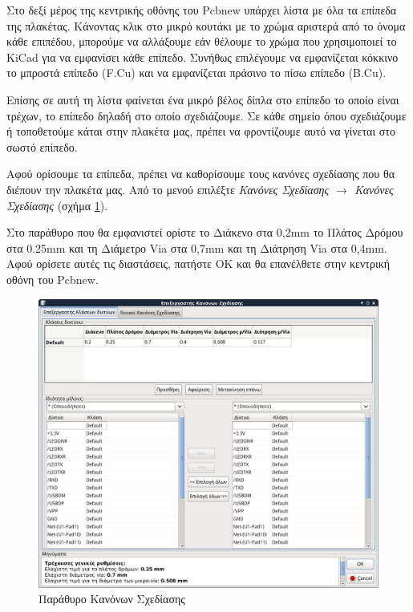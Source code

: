 \documentclass[a4paper]{article}
\begin{document}
Στο δεξί μέρος της κεντρικής οθόνης του Pcbnew υπάρχει λίστα με όλα τα επίπεδα της πλακέτας. Κάνοντας κλικ στο μικρό κουτάκι με το χρώμα αριστερά από το όνομα κάθε επιπέδου, μπορούμε να αλλάξουμε εάν θέλουμε το χρώμα που χρησιμοποιεί το \textenglish{KiCad} για να εμφανίσει κάθε επίπεδο. Συνήθως επιλέγουμε να εμφανίζεται κόκκινο το μπροστά επίπεδο (F.Cu) και να εμφανίζεται πράσινο το πίσω επίπεδο (B.Cu).

Επίσης σε αυτή τη λίστα φαίνεται ένα μικρό βέλος δίπλα στο επίπεδο το οποίο είναι τρέχων, το επίπεδο δηλαδή στο οποίο σχεδιάζουμε. Σε κάθε σημείο όπου σχεδιάζουμε ή τοποθετούμε κάται στην πλακέτα μας, πρέπει να φροντίζουμε αυτό να γίνεται στο σωστό επίπεδο.

Αφού ορίσουμε τα επίπεδα, πρέπει να καθορίσουμε τους κανόνες σχεδίασης που θα διέπουν την πλακέτα μας. Από το μενού επιλέξτε \textit{Κανόνες Σχεδίασης $\rightarrow$ Κανόνες Σχεδίασης} (σχήμα \ref{fig:pcb-dial-desset}). 

Στο παράθυρο που θα εμφανιστεί ορίστε το Διάκενο στα 0,2mm το Πλάτος Δρόμου στα 0.25mm και τη Διάμετρο Via στα 0,7mm και τη Διάτρηση Via στα 0,4mm. Αφού ορίσετε αυτές τις διαστάσεις, πατήστε ΟΚ και θα επανέλθετε στην κεντρική οθόνη του Pcbnew.

\begin{figure}
  \begin{center}
    \includegraphics[width=.9\textwidth]{img/pcb-dial-desset.png}
    \caption{Παράθυρο Κανόνων Σχεδίασης}
    \label{fig:pcb-dial-desset}
  \end{center}
\end{figure}
\end{document}
